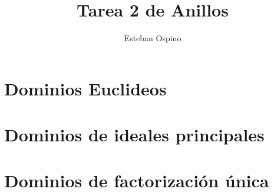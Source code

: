 \documentclass{amsart}
\title{Tarea 2 de Anillos}
\author{Esteban Ospino}
\begin{document}
\maketitle \thispagestyle{fancy}

\section{Dominios Euclideos}
% 
% 
% 

\section{Dominios de ideales principales}
% 
% 
% 
% 

\section{Dominios de factorización única}
% 

\end{document}
